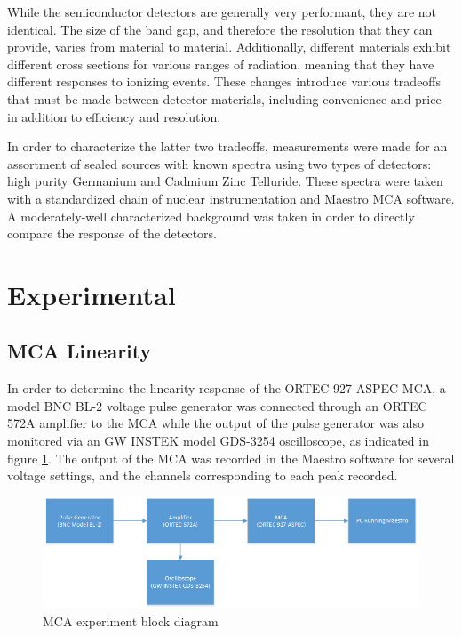 \documentclass[12pt]{article}
\begin{document}
While the semiconductor detectors are generally very performant, they are not identical. The size of the band gap, and therefore the resolution that they can provide, varies from material to material. Additionally, different materials exhibit different cross sections for various ranges of radiation, meaning that they have different responses to ionizing events. These changes introduce various tradeoffs that must be made between detector materials, including convenience and price in addition to efficiency and resolution.

In order to characterize the latter two tradeoffs, measurements were made for an assortment of sealed sources with known spectra using two types of detectors: high purity Germanium and Cadmium Zinc Telluride. These spectra were taken with a standardized chain of nuclear instrumentation and Maestro MCA software. A moderately-well characterized background was taken in order to directly compare the response of the detectors.

\section{Experimental}
\subsection{MCA Linearity}
In order to determine the linearity response of the ORTEC 927 ASPEC MCA, a model BNC BL-2 voltage pulse generator was connected through an ORTEC 572A amplifier to the MCA while the output of the pulse generator was also monitored via an GW INSTEK model GDS-3254 oscilloscope, as indicated in figure \ref{fig:MCAblock}. The output of the MCA was recorded in the Maestro software for several voltage settings, and the channels corresponding to each peak recorded.

\begin{center}
\begin{figure}
	\includegraphics[width=\linewidth]{block1}
	\caption{MCA experiment block diagram}
	\label{fig:MCAblock}
\end{figure}
\end{center}
\end{document}
